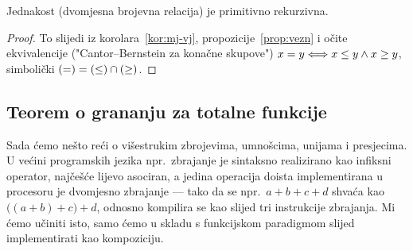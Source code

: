 \begin{korolar}[{name=[primitivna rekurzivnost jednakosti]}]\label{kor:jednakost}
Jednakost (dvomjesna brojevna relacija) je primitivno rekurzivna.
\end{korolar}
\begin{proof}
To slijedi iz korolara~\ref{kor:mj-vj}, propozicije~\ref{prop:vezn} i očite ekvivalencije ("Cantor--Bernstein za konačne skupove")
    $x = y \Longleftrightarrow x\le y\land x\ge y$,
simbolički $(=)=(\le)\cap(\ge)$.%
\end{proof}

\subsection{Teorem o grananju za totalne funkcije}

Sada ćemo nešto reći o višestrukim zbrojevima, umnošcima, unijama i presjecima. U većini programskih jezika npr.\ zbrajanje je sintaksno realizirano kao infiksni operator, najčešće lijevo asociran, a jedina operacija doista implementirana u procesoru je dvomjesno zbrajanje --- tako da se npr.\ $a+b+c+d$ shvaća kao $\bigl((a+b)+c\bigr)+d$, odnosno kompilira se kao slijed tri instrukcije zbrajanja. Mi ćemo učiniti isto, samo ćemo u skladu s funkcijskom paradigmom slijed implementirati kao kompoziciju.


